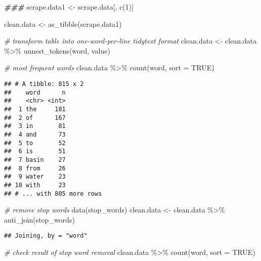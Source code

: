 \documentclass[
]{article}
\newenvironment{Shaded}{\begin{snugshade}}{\end{snugshade}}
\newcommand{\AttributeTok}[1]{\textcolor[rgb]{0.77,0.63,0.00}{#1}}
\newcommand{\CommentTok}[1]{\textcolor[rgb]{0.56,0.35,0.01}{\textit{#1}}}
\newcommand{\ConstantTok}[1]{\textcolor[rgb]{0.00,0.00,0.00}{#1}}
\newcommand{\DecValTok}[1]{\textcolor[rgb]{0.00,0.00,0.81}{#1}}
\newcommand{\DocumentationTok}[1]{\textcolor[rgb]{0.56,0.35,0.01}{\textbf{\textit{#1}}}}
\newcommand{\FunctionTok}[1]{\textcolor[rgb]{0.00,0.00,0.00}{#1}}
\newcommand{\NormalTok}[1]{#1}
\newcommand{\OtherTok}[1]{\textcolor[rgb]{0.56,0.35,0.01}{#1}}
\newcommand{\SpecialCharTok}[1]{\textcolor[rgb]{0.00,0.00,0.00}{#1}}
\begin{document}
\begin{Shaded}
\begin{Highlighting}[]
\DocumentationTok{\#\#\#}
\NormalTok{scrape.data1 }\OtherTok{\textless{}{-}}\NormalTok{ scrape.data[, }\FunctionTok{c}\NormalTok{(}\DecValTok{1}\NormalTok{)]}

\NormalTok{clean.data }\OtherTok{\textless{}{-}} \FunctionTok{as\_tibble}\NormalTok{(scrape.data1)}


\CommentTok{\# transform table into one{-}word{-}per{-}line tidytext format}
\NormalTok{clean.data }\OtherTok{\textless{}{-}}\NormalTok{ clean.data }\SpecialCharTok{\%\textgreater{}\%}
  \FunctionTok{unnest\_tokens}\NormalTok{(word, value)}

\CommentTok{\# most frequent words}
\NormalTok{clean.data }\SpecialCharTok{\%\textgreater{}\%}
  \FunctionTok{count}\NormalTok{(word, }\AttributeTok{sort =} \ConstantTok{TRUE}\NormalTok{)}
\end{Highlighting}
\end{Shaded}

\begin{verbatim}
## # A tibble: 815 x 2
##    word      n
##    <chr> <int>
##  1 the     181
##  2 of      167
##  3 in       81
##  4 and      73
##  5 to       52
##  6 is       51
##  7 basin    27
##  8 from     26
##  9 water    23
## 10 with     23
## # ... with 805 more rows
\end{verbatim}

\begin{Shaded}
\begin{Highlighting}[]
\CommentTok{\# remove stop words}
\FunctionTok{data}\NormalTok{(stop\_words)}
\NormalTok{clean.data }\OtherTok{\textless{}{-}}\NormalTok{ clean.data }\SpecialCharTok{\%\textgreater{}\%}
  \FunctionTok{anti\_join}\NormalTok{(stop\_words)}
\end{Highlighting}
\end{Shaded}

\begin{verbatim}
## Joining, by = "word"
\end{verbatim}

\begin{Shaded}
\begin{Highlighting}[]
\CommentTok{\# check result of stop word removal}
\NormalTok{clean.data }\SpecialCharTok{\%\textgreater{}\%}
  \FunctionTok{count}\NormalTok{(word, }\AttributeTok{sort =} \ConstantTok{TRUE}\NormalTok{)}
\end{Highlighting}
\end{Shaded}
\end{document}
